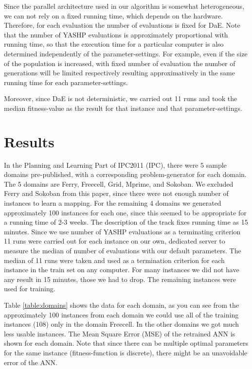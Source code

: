 \documentclass{acm_proc_article-sp}
\begin{document}
Since the parallel architecture used in our algorithm is somewhat heterogeneous, we can not rely on a fixed running time, which depends on the hardware. Therefore, for each evaluation the number of evaluations is fixed for DaE. Note that the number of YASHP evaluations is approximately proportional with running time, so that the execution time for a particular computer is also determined independently of the parameter-settings. For example, even if the size of the population is increased, with fixed number of evaluation the number of generations will be limited respectively resulting approximatively in the same running time for each parameter-settings. 

Moreover, since DaE is not deterministic, we carried out 11 runs and took the median fitness-value as the result for that instance and that parameter-settings.

\section{Results}
\label{section:results}

In the Planning and Learning Part of IPC2011 (IPC), there were 5 sample domains pre-published, with a corresponding problem-generator for each domain. The 5 domains are Ferry, Freecell, Grid, Mprime, and Sokoban. We excluded Ferry and Sokoban from this paper, since there were not enough number of instances to learn a mapping. For the remaining 4 domains we generated approximately 100 instances for each one, since this seemed to be appropriate for a running time of 2-3 weeks. The description of the track fixes running time as 15 minutes. Since we use number of YASHP evaluations as a terminating criterion 11 runs were carried out for each instance on our own, dedicated server to measure the median of number of evaluations with our default parameters. The median of 11 runs were taken and used as a termination criterion for each instance in the train set on any computer. For many instances we did not have any result in 15 minutes, those we had to drop. The remaining instances were used for training. 


Table \ref{table:domains} shows the data for each domain, as you can see from the approximately 100 instances from each domain we could use all of the training instances (108) only in the domain Freecell. In the other domains we got much less usable instances. The Mean Square Error (MSE) of the retrained ANN is shown for each domain. Note that since there can be multiple optimal parameters for the same instance (fitness-function is discrete), there might be an unavoidable error of the ANN.
\end{document}
